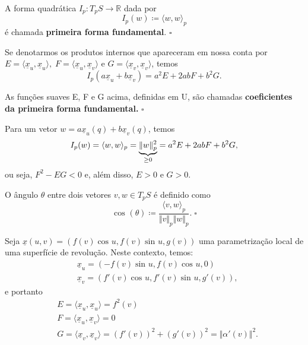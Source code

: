 \documentclass[../differential_geometry.tex]{subfiles}
\begin{document}
\begin{def*}
	A forma quadrática \(I_{p}:T_{p}S\rightarrow \mathbb{R}\) dada por
	\[
		I_{p}(w)\coloneqq \langle w, w \rangle_{p}
	\]
	é chamada \textbf{primeira forma fundamental}. \(\square\)
\end{def*}
Se denotarmos os produtos internos que apareceram em nossa conta por \(E = \langle \underline{x}_{u}, \underline{x}_{u} \rangle,\; F = \langle \underline{x}_{u}, \underline{x}_{v} \rangle\) e \(G = \langle \underline{x}_{v}, \underline{x}_{v} \rangle\), temos
\[
	I_{p}(a\underline{x}_{u}+b\underline{x}_{v}) = a^{2} E + 2ab F + b^{2}G.
\]
\begin{def*}
	As funções suaves E, F e G acima, definidas em U, são chamadas \textbf{coeficientes da primeira forma fundamental.} \(\square\)
\end{def*}

Para um vetor \(w = a\underline{x}_{u}(q) + b\underline{x}_{v}(q)\), temos
\[
	I_{p}(w) = \langle w, w \rangle_{p} = \underbrace{\Vert w \Vert_{p}^{2}}_{\mathclap{\geq 0}}=a^{2}E + 2abF + b^{2}G,
\]
ou seja, \(F^{2}-EG < 0\) e, além disso, \(E> 0\) e \(G > 0\).
\begin{def*}
	O ângulo \(\theta \) entre dois vetores \(v, w\in T_{p}S\) é definido como
	\[
		\cos^{}{(\theta )}\coloneqq \frac{\langle v, w \rangle_{p}}{\Vert v \Vert_{p}\Vert w \Vert_{p}}. \; \square
	\]
\end{def*}
\begin{example}
	Seja \(\underline{x}(u, v) = (f(v)\cos^{}{u}, f(v)\sin^{}{u}, g(v))\) uma parametrização local de uma superfície de revolução. Neste contexto, temos:
	\begin{align*}
		 & \underline{x}_{u} = (-f(v)\sin^{}{u}, f(v)\cos^{}{u}, 0)       \\
		 & \underline{x}_{v} = (f'(v)\cos^{}{u}, f'(v)\sin^{}{u}, g'(v)),
	\end{align*}
	e portanto
	\begin{align*}
		 & E = \langle \underline{x}_{u}, \underline{x}_{u} \rangle = f^{2}(v)                                               \\
		 & F = \langle \underline{x}_{u}, \underline{x}_{v} \rangle = 0                                                      \\
		 & G = \langle \underline{x}_{v}, \underline{x}_{v} \rangle = (f'(v))^{2}+(g'(v))^{2} = \Vert \alpha '(v) \Vert^{2}.
	\end{align*}
\end{example}
\end{document}
